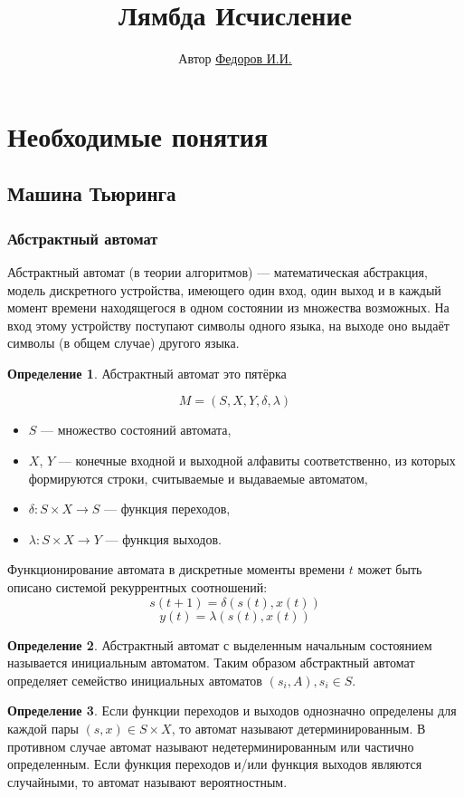 \documentclass[10pt,twoside]{article}
\title{Лямбда Исчисление}
\author{Автор \href{http://vk.com/beizero}{Федоров И.И.}}
\theoremstyle{plain}
\theoremstyle{definition}
\newtheorem{defi}{Определение}
\begin{document}
\maketitle
\tableofcontents
\section{Необходимые понятия}
\subsection{Машина Тьюринга}
\subsubsection{Абстрактный автомат}

Абстрактный автомат (в теории алгоритмов) — математическая абстракция, модель дискретного устройства, имеющего один вход, один выход и в каждый момент времени находящегося в одном состоянии из множества возможных. На вход этому устройству поступают символы одного языка, на выходе оно выдаёт символы (в общем случае) другого языка.

\begin{defi}
Абстрактный автомат это пятёрка

$$M=(S,X,Y,\delta ,\lambda )$$
\begin{itemize}
\item $S$ — множество состояний автомата,
\item $X$, $Y$ — конечные входной и выходной алфавиты соответственно, из которых формируются строки, считываемые и выдаваемые автоматом,
\item $\delta :S\times X\rightarrow S$ — функция переходов,
\item $\lambda :S\times X\rightarrow Y$ — функция выходов.
\end{itemize}
Функционирование автомата в дискретные моменты времени $t$ может быть описано системой рекуррентных соотношений:
$${{s(t+1)=\delta (s(t),x(t))}}$$
$${{y(t)=\lambda (s(t),x(t))}}$$
\end{defi}
\begin{defi}
Абстрактный автомат с выделенным начальным состоянием называется инициальным автоматом. Таким образом абстрактный автомат определяет семейство инициальных автоматов $(s_{i},A),s_{i}\in S$.
\end{defi}
\begin{defi}
Если функции переходов и выходов однозначно определены для каждой пары ${{(s,x)\in S\times X}}$, то автомат называют детерминированным. В противном случае автомат называют недетерминированным или частично определенным. Если функция переходов и/или функция выходов являются случайными, то автомат называют вероятностным.
\end{defi}
\end{document}
